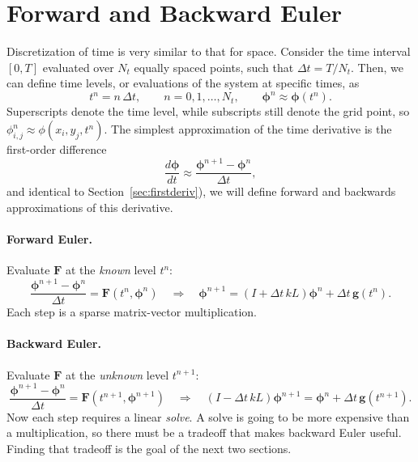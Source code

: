\section{Forward and Backward Euler}
\label{sec:ts-euler}

Discretization of time is very similar to that for space. Consider the time interval $[0,T]$ evaluated over $N_t$ equally spaced points, such that
$\Delta t = T/N_t$. Then, we can define time levels, or evaluations of the system at specific times, as
\begin{equation}
  t^n = n\,\Delta t, \qquad n = 0,1,\dots,N_t,
  \qquad \boldsymbol{\phi}^n \approx \boldsymbol{\phi}(t^n).
  \label{eq:ts-levels}
\end{equation}
Superscripts denote the time level, while subscripts still denote the
grid point, so $\phi^n_{i,j} \approx \phi(x_i, y_j, t^n)$. The simplest approximation of the
time derivative is the first-order difference
\[
  \frac{d\boldsymbol{\phi}}{dt} \approx \frac{\boldsymbol{\phi}^{n+1} - \boldsymbol{\phi}^n}{\Delta t},
\]
and identical to Section~\ref{sec:firstderiv}), we will define forward and backwards approximations of this derivative.

\paragraph{Forward Euler.} Evaluate $\mathbf{F}$ at the \emph{known} level $t^n$:
\begin{equation}
  \frac{\boldsymbol{\phi}^{n+1} - \boldsymbol{\phi}^n}{\Delta t} = \mathbf{F}(t^n,\boldsymbol{\phi}^n)
  \quad\Longrightarrow\quad
  \boxed{\boldsymbol{\phi}^{n+1} = \left(I + \Delta t\,k L\right)\boldsymbol{\phi}^n + \Delta t\,\mathbf{g}(t^n).}
  \label{eq:ts-FE}
\end{equation}
Each step is a sparse matrix-vector multiplication. 

\paragraph{Backward Euler.} Evaluate $\mathbf{F}$ at the \emph{unknown} level $t^{n+1}$:
\begin{equation}
  \frac{\boldsymbol{\phi}^{n+1} - \boldsymbol{\phi}^n}{\Delta t} = \mathbf{F}(t^{n+1},\boldsymbol{\phi}^{n+1})
  \quad\Longrightarrow\quad
  \boxed{\left(I - \Delta t\,k L\right)\boldsymbol{\phi}^{n+1} = \boldsymbol{\phi}^n + \Delta t\,\mathbf{g}(t^{n+1}).}
  \label{eq:ts-BE}
\end{equation}
Now each step requires a linear \emph{solve}. A solve is going to be more expensive than a multiplication, so there must be a tradeoff that makes backward Euler useful. Finding that tradeoff is the goal of the next two sections.

